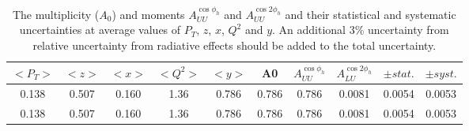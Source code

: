 \documentclass[aps,prl,twocolumn,showpacs,superscriptaddress,groupedaddress]{revtex4}  %
\newcommand{\xbj}{x}
\begin{document}
\begin{table*}[ht]
  \begin{center}	
    \begin{tabular}{|c|c|c|c|c||c||c||c|c|c|}
       \hline	
	  {$<P_T>$} & {$<z>$} & {$<\xbj >$} & {$<Q^2 >$} & {$<y>$} & A0 & {$A^{\cos\phi_h}_{UU}$} & {$A^{\cos 2\phi_h}_{LU}$} & {$\pm stat.$}  & {$\pm syst.$}\\
	  \hline 
	    \hline 
{0.138 } &  {0.507} & {0.160} & {1.36} & {0.786} & {0.786} & {0.786} & {0.0081} &  {0.0054} & {0.0053}\\
{0.138 } &  {0.507} & {0.160} & {1.36} & {0.786} & {0.786} & {0.786} & {0.0081} &  {0.0054} & {0.0053}\\
	  \hline
    \end{tabular}	
    \caption{The multiplicity ($A_0$) and  moments $A^{\cos \phi_h}_{UU}$ and  $A^{\cos 2\phi_h}_{UU}$ and their statistical and systematic uncertainties at average values of $P_T$, $z$, $\xbj$, $Q^2$ and $y$. An additional 3\% uncertainty from relative uncertainty from radiative effects should be added to the total uncertainty.} 
    \label{aluxbtb}
  \end{center}	
\end{table*}
%
%

%

\end{document}
